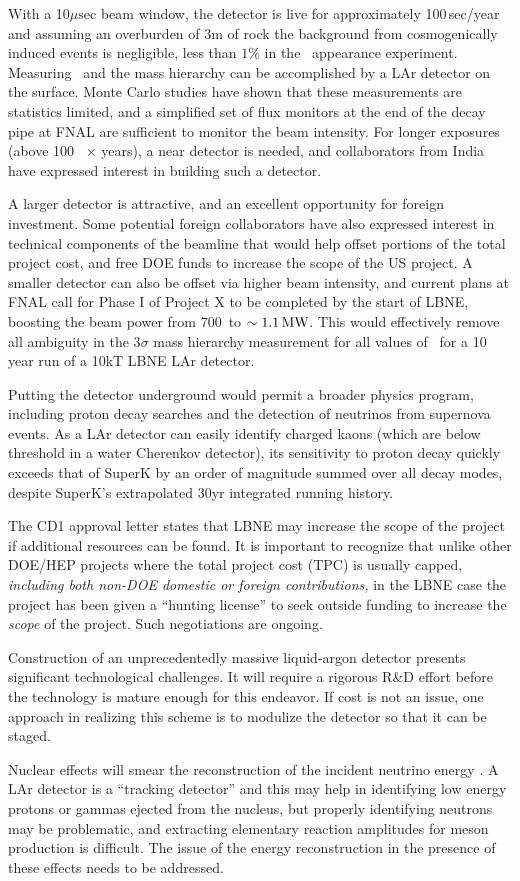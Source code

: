 With a 10$\mu\mathrm{sec}$ beam window, the detector is live for approximately 100\,sec/year and assuming an overburden of 3m of rock the background from cosmogenically induced events is negligible,  less than $1\%$ in the \nue\ appearance experiment. Measuring \deltacp\ and the mass hierarchy can be accomplished by a LAr detector on the surface. Monte Carlo studies have shown that these measurements are statistics limited, and a simplified set of flux monitors at the end of the decay pipe at FNAL are sufficient to monitor the beam intensity.
For longer exposures (above 100 \kt\ $\times$ years), a near detector is needed, and collaborators from India have expressed interest in building such a detector.

A larger detector is attractive, and an excellent opportunity for
foreign investment. Some potential foreign collaborators have also
expressed interest in technical components of the beamline that would
help offset portions of the total project cost, and free DOE funds to increase
the scope of the US project. A smaller detector can also be offset via
higher beam intensity, and current plans at FNAL call for Phase I of
Project X to be completed by the start of LBNE, boosting the beam
power from 700\kw\ to $\sim1.1\,\mathrm{MW}$. This would effectively remove all
ambiguity in the 3$\sigma$ mass hierarchy measurement for all values
of \deltacp\  for a 10 year run of a 10kT LBNE LAr detector. 

Putting the detector underground would permit a broader physics
program, including proton decay searches and the detection of
neutrinos from supernova events. As a LAr
detector can easily  
identify charged kaons (which are below threshold in a water Cherenkov
detector), its sensitivity to proton decay quickly exceeds that of
SuperK by an order 
of magnitude summed over all decay modes, despite SuperK's
extrapolated 30yr integrated running history.   


The CD1 approval letter states that  LBNE may increase the scope of the project if additional resources can be found.
It is important to recognize that unlike other DOE/HEP projects where
the total project cost  (TPC) is usually capped, {\it including both
non-DOE domestic or foreign contributions, }in the LBNE case the
project has been given a ``hunting license'' to seek outside funding
to increase the {\it scope }of the project. Such negotiations are
ongoing.  

Construction of an unprecedentedly massive liquid-argon detector
presents significant technological challenges.  
It will require a  rigorous R\&D effort before the technology
is mature enough for this endeavor. 
If cost is not an issue, one approach in realizing this scheme is to modulize
the detector so that it can be staged. 

Nuclear effects will smear the reconstruction of the incident neutrino
energy \cite{Mosel}. A LAr detector is a ``tracking detector'' and
this may help in identifying low energy protons or gammas ejected from
the nucleus, but properly identifying neutrons may be problematic,
and extracting elementary reaction amplitudes for meson production is
difficult. The issue of the energy reconstruction in the presence of
these effects needs to be addressed.

